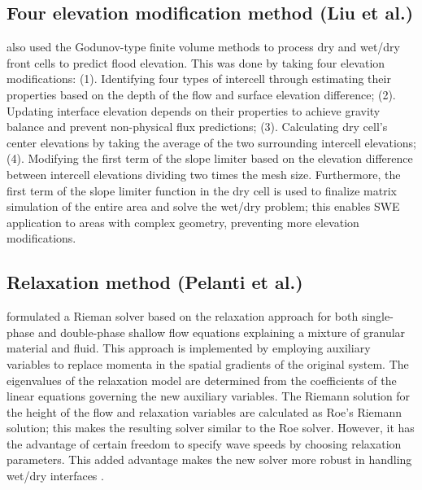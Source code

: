 \documentclass[10pt,a4paper]{article}
\begin{document}
	\subsection{Four elevation modification  method (Liu et al.)}
		\citet{li-ta-wa-ca-ba-ch-li:2021} also used the Godunov-type finite volume methods to process dry and wet/dry front cells to predict flood elevation. This was done by taking four elevation modifications: (1).  Identifying four types of intercell through estimating their properties based on the depth of the flow and surface elevation difference; (2). Updating interface elevation depends on their properties to achieve gravity balance and prevent non-physical flux predictions;  (3).  Calculating dry cell's center elevations by taking the average of the two surrounding intercell elevations; (4). Modifying the first term of the slope limiter based on the elevation difference between intercell elevations dividing two times the mesh size. Furthermore, the first term of the slope limiter function in the dry cell is used to finalize matrix simulation of the entire area and solve the wet/dry problem; this enables SWE application to areas with complex geometry, preventing more elevation modifications.
	
	\subsection{Relaxation method (Pelanti et al.)}

 \citet{pelanti2011riemann} formulated a Rieman solver based on the relaxation approach for both single-phase and double-phase shallow flow equations explaining a mixture of granular material and fluid. This approach is implemented by employing auxiliary variables to replace momenta in the spatial gradients of the original system. The eigenvalues of the relaxation model are determined from the coefficients of the linear equations governing the new auxiliary variables.  The Riemann solution for the height of the flow and relaxation variables are calculated as Roe's Riemann solution; this makes the resulting solver similar to the Roe solver. However, it has the advantage of certain freedom to specify wave speeds by choosing relaxation parameters. This added advantage makes the new solver more robust in handling wet/dry interfaces \cite{pelanti2008relaxation,pelanti2011riemann}.
\end{document}
